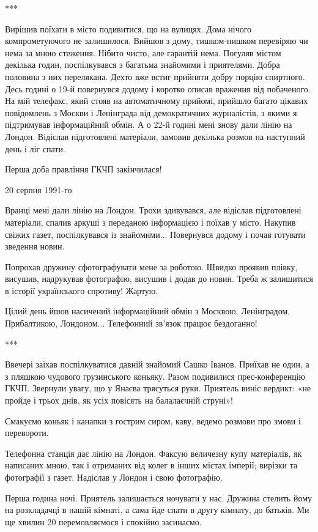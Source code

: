 ***

Вирішив поїхати в місто подивитися, що на вулицях. Дома нічого компрометуючого
не залишилося. Вийшов з дому, тишком-нишком перевіряю чи нема за мною стеження.
Нібито чисто, але гарантій нема. Погуляв містом декілька годин, поспілкувався з
багатьма знайомими і приятелями. Добра половина з них перелякана. Дехто вже
встиг прийняти добру порцію спиртного. Десь годині о 19-й повернувся додому і
коротко описав враження від побаченого. На мій телефакс, який стояв на
автоматичному прийомі, прийшло багато цікавих повідомлень з Москви і Ленінграда
від демократичних журналістів, з якими я підтримував інформаційний обмін. А о
22-й годині мені знову дали лінію на Лондон. Відіслав підготовлені матеріали,
замовив декілька розмов на наступний день і ліг спати. 

Перша доба правління ГКЧП закінчилася!

20 серпня 1991-го

Вранці мені дали лінію на Лондон. Трохи здивувався, але відіслав підготовлені
матеріали, спалив аркуші з переданою інформацією і поїхав у місто. Накупив
свіжих газет, поспілкувався із знайомими... Повернувся додому і почав готувати
зведення новин. 

Попрохав дружину сфотографувати мене за роботою. Швидко проявив плівку,
висушив, надрукував фотографію, висушив і додав до новин. Треба ж залишитися в
історії українського спротиву! Жартую.

Цілий день йшов насичений інформаційний обмін з Москвою, Ленінградом,
Прибалтикою, Лондоном... Телефонний зв’язок працює бездоганно!

***

Ввечері заїхав поспілкуватися давній знайомий Сашко Іванов. Приїхав не один, а
з пляшкою чудового грузинського коньяку. Разом подивилися прес-конференцію
ГКЧП. Звернули увагу, що у Янаєва трясуться руки. Приятель виніс вердикт: «не
пройде і трьох днів, як усіх повісять на балалаєчній струні»!

Смакуємо коньяк і канапки з гострим сиром, каву, ведемо розмови про змови і
перевороти.

Телефонна станція дає лінію на Лондон. Факсую величезну купу матеріалів, як
написаних мною, так і отриманих від колег в інших містах імперії; вирізки та
фотографії з газет. Надіслав у Лондон і свою фотографію. 

Перша година ночі. Приятель залишається ночувати у нас. Дружина стелить йому на
розкладачці в нашій кімнаті, а сама йде спати в другу кімнату, до батьків. Ми
ще хвилин 20 перемовляємося і спокійно засинаємо.

